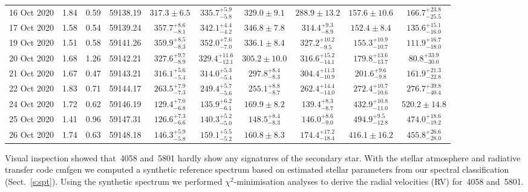 \documentclass[fleqn,usenatbib]{mnras}
\begin{document}
\begin{table*}
\begin{tabular}{lcclcccc|cc}
		16 Oct 2020 & 1.84 & 0.59 & 59138.19 & $317.3 \pm 6.5        $& $335.7^{+5.9 }_{-5.8 }$& $329.0\pm 9.1       $& $288.9 \pm 13.2       $& $157.6\pm 10.6        $& $166.7^{+23.8}_{-25.5}$\\
		17 Oct 2020 & 1.58 & 0.54 & 59139.24 & $357.7^{+8.6 }_{-8.1 }$& $342.1^{+4.4 }_{-4.2 }$& $346.8\pm 7.8       $& $314.4^{+9.3 }_{-8.9 }$& $152.4\pm 8.4         $& $135.6^{+15.1}_{-16.0}$\\
		19 Oct 2020 & 1.51 & 0.58 & 59141.26 & $359.9^{+8.5 }_{-8.3 }$& $352.0^{+7.6 }_{-7.0 }$& $336.1\pm 8.4       $& $327.2^{+10.2}_{-9.5 }$& $155.3^{+10.9}_{-10.7}$& $111.9^{+16.7}_{-18.0}$\\
		20 Oct 2020 & 1.68 & 1.26 & 59142.21 & $327.6^{+9.7 }_{-8.9 }$& $329.4^{+11.6}_{-12.1}$& $305.2\pm 10.0      $& $316.6^{+15.2}_{-14.1}$& $179.8^{+13.6}_{-13.7}$& $80.8 ^{+33.9}_{-30.0}$\\
		21 Oct 2020 & 1.67 & 0.47 & 59143.21 & $316.1^{+5.6 }_{-5.4 }$& $314.0^{+5.3 }_{-5.4 }$& $297.8^{+8.4}_{-8.3}$& $304.4^{+11.3}_{-10.9}$& $201.6^{+9.6 }_{-9.8 }$& $161.9^{+21.3}_{-22.8}$\\
		22 Oct 2020 & 1.83 & 0.71 & 59144.17 & $263.5^{+7.9 }_{-7.3 }$& $249.4^{+5.7 }_{-5.6 }$& $255.1^{+8.8}_{-8.7}$& $262.4^{+14.4}_{-14.0}$& $272.4^{+10.7}_{-10.6}$& $276.7^{+39.8}_{-40.4}$\\
		24 Oct 2020 & 1.72 & 0.62 & 59146.19 & $129.4^{+7.0 }_{-6.8 }$& $135.9^{+6.2 }_{-6.1 }$& $169.9\pm 8.2       $& $139.4^{+8.3 }_{-8.7 }$& $432.9^{+10.8}_{-11.0}$& $520.2 \pm 14.8       $\\
		25 Oct 2020 & 1.41 & 0.96 & 59147.31 & $126.6^{+7.3 }_{-6.6 }$& $140.3^{+5.2 }_{-5.0 }$& $148.5^{+8.4}_{-8.3}$& $146.0^{+8.6 }_{-9.0 }$& $494.9^{+9.5 }_{-12.8}$& $474.0^{+18.6}_{-19.2}$\\
		26 Oct 2020 & 1.74 & 0.63 & 59148.18 & $146.3^{+5.9 }_{-5.8 }$& $159.1^{+5.5 }_{-5.2 }$& $160.8\pm 8.3       $& $174.4^{+17.2}_{-18.4}$& $416.1\pm 16.2        $& $455.8^{+26.6}_{-28.0}$\\
		\hline
	\end{tabular}
\end{table*}



Visual inspection showed that \,4058 and \,5801 hardly show any signatures of the secondary star. With the stellar atmosphere and radiative transfer code {\sc cmfgen} \citep{hillier1998} we computed a synthetic reference spectrum based on estimated stellar parameters from our spectral classification (Sect.~\ref{s:spt}). Using the synthetic spectrum we performed $\chi^2$-minimisation analyses to derive the radial velocities (RV) for \,4058 and \,5801.
\end{document}

